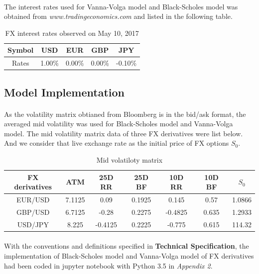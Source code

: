 \paragraph{}
The interest rates used for Vanna-Volga model and Black-Scholes model was obtained from \textit{www.tradingeconomics.com} and listed in the following table.

\begin{table}[htb]
\centering
\caption{{FX interest rates observed on May 10, 2017}}
\begin{tabular}{ccccc}
\hline	\hline %
Symbol & USD & EUR & GBP & JPY \\ [1ex]%
\hline
Rates & 1.00\% & 0.00\% & 0.00\% & -0.10\%  \\ [1ex]
\hline
\end{tabular}
\label{table:FX_rates}
\end{table}

\subsection{Model Implementation}
\paragraph{}
As the volatility matrix obtianed from Bloomberg is in the bid/ask format, the averaged mid volatility was used for Black-Scholes model and Vanna-Volga model. The mid volatility matrix data of three FX derivatives were list below. And we consider that live exchange rate as the initial price of FX options $S_0$.

\begin{table}[htb]
\centering
\caption{Mid volatiloty matrix}
\begin{tabular}{ccccccc}
\hline \hline
FX derivatives & ATM  & 25D RR  & 25D BF  & 10D RR  & 10D BF & $S_0$\\ [0.5ex]
\hline 
EUR/USD  & 7.1125 &0.09& 0.1925 &0.145 &0.57&1.0866 \\
GBP/USD & 6.7125 &-0.28&0.2275&-0.4825&0.635&1.2933\\
USD/JPY & 8.225 & -0.4125 &0.2225&-0.775&0.615&114.32\\[0.5ex]
\hline
\end{tabular}
\end{table}

\paragraph{}
With the conventions and definitions specified in \textbf{Technical Specification}, the implementation of Black-Scholes model and Vanna-Volga model of FX derivatives had been coded in jupyter notebook with Python 3.5 in \textit{Appendix 2}.

